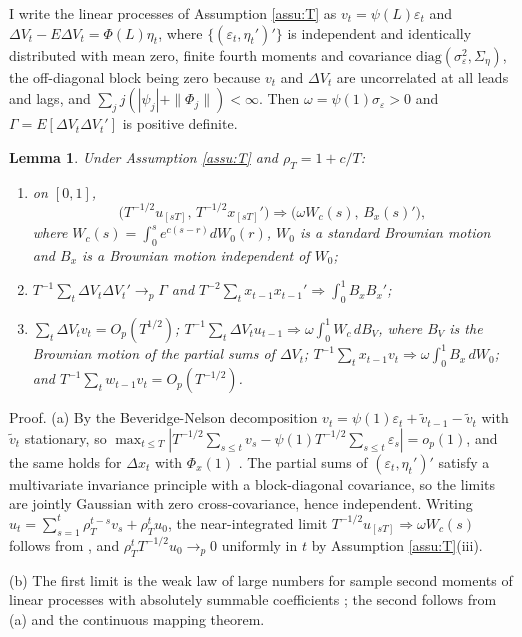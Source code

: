 \documentclass[12pt,a4paper]{article}
\newtheorem{lem}{Lemma}
\theoremstyle{definition}
\theoremstyle{definition}\newtheorem{example}{Example}
\theoremstyle{definition}\newtheorem{definition}{Definition}
\begin{document}
I write the linear processes of Assumption \ref{assu:T} as $v_t=\psi(L)\varepsilon_t$ and $\Delta V_t-E\Delta V_t=\Phi(L)\eta_t$, where $\{(\varepsilon_t,\eta_t')'\}$ is independent and identically distributed with mean zero, finite fourth moments and covariance $\mathrm{diag}(\sigma^2_\varepsilon,\Sigma_\eta)$, the off-diagonal block being zero because $v_t$ and $\Delta V_t$ are uncorrelated at all leads and lags, and $\sum_jj(|\psi_j|+\|\Phi_j\|)<\infty$. Then $\omega=\psi(1)\sigma_\varepsilon>0$ and $\Gamma=E[\Delta V_t\Delta V_t']$ is positive definite.

\begin{lem}\label{lem:fclt}
Under Assumption \ref{assu:T} and $\rho_T=1+c/T$:
\begin{enumerate}
\item[(a)] on $[0,1]$, \[\big(T^{-1/2}u_{[sT]},\,T^{-1/2}x_{[sT]}'\big)\Rightarrow\big(\omega W_c(s),\,B_x(s)'\big),\] where $W_c(s)=\int_0^se^{c(s-r)}dW_0(r)$, $W_0$ is a standard Brownian motion and $B_x$ is a Brownian motion independent of $W_0$;
\item[(b)] $T^{-1}\sum_t\Delta V_t\Delta V_t'\to_p\Gamma$ and $T^{-2}\sum_tx_{t-1}x_{t-1}'\Rightarrow\int_0^1B_xB_x'$;
\item[(c)] $\sum_t\Delta V_tv_t=O_p(T^{1/2})$; $T^{-1}\sum_t\Delta V_tu_{t-1}\Rightarrow\omega\int_0^1W_c\,dB_V$, where $B_V$ is the Brownian motion of the partial sums of $\Delta V_t$; $T^{-1}\sum_tx_{t-1}v_t\Rightarrow\omega\int_0^1B_x\,dW_0$; and $T^{-1}\sum_tw_{t-1}v_t=O_p(T^{-1/2})$.
\end{enumerate}
\end{lem}

\noindent Proof. (a) By the Beveridge-Nelson decomposition $v_t=\psi(1)\varepsilon_t+\tilde v_{t-1}-\tilde v_t$ with $\tilde v_t$ stationary, so $\max_{t\leq T}|T^{-1/2}\sum_{s\leq t}v_s-\psi(1)T^{-1/2}\sum_{s\leq t}\varepsilon_s|=o_p(1)$, and the same holds for $\Delta x_t$ with $\Phi_x(1)$ \citep[Theorem 3.4]{PhillipsSolo1992}. The partial sums of $(\varepsilon_t,\eta_t')'$ satisfy a multivariate invariance principle with a block-diagonal covariance, so the limits are jointly Gaussian with zero cross-covariance, hence independent. Writing $u_t=\sum_{s=1}^t\rho_T^{t-s}v_s+\rho_T^tu_0$, the near-integrated limit $T^{-1/2}u_{[sT]}\Rightarrow\omega W_c(s)$ follows from \citet[Lemma 1]{Phillips1987}, and $\rho_T^tT^{-1/2}u_0\to_p0$ uniformly in $t$ by Assumption \ref{assu:T}(iii).

(b) The first limit is the weak law of large numbers for sample second moments of linear processes with absolutely summable coefficients \citep[Theorem 3.7, Remark 3.9(i) and Section 4(i)]{PhillipsSolo1992}; the second follows from (a) and the continuous mapping theorem.
\end{document}
